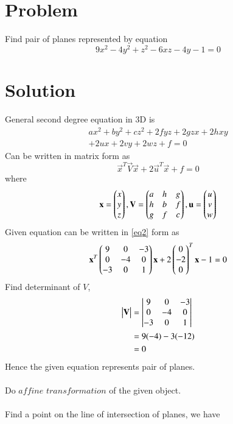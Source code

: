 \documentclass[journal,12pt,twocolumn]{IEEEtran}
\begin{document}
\section{Problem}
Find pair of planes represented by equation 
\begin{equation}\nonumber
	9x^2-4y^2+z^2-6xz-4y-1=0
\end{equation}
\section{Solution}
General second degree equation in 3D is
\begin{multline}\label{eq1}
	ax^2 + by^2 + cz^2 + 2fyz + 2gzx + 2hxy \\ + 2ux + 2vy + 2wz + f = 0
\end{multline}
Can be written in matrix form as
\begin{equation}\label{eq2}
	\vec{x}^T\vec{V}\vec{x} + 2\vec{u}^T\vec{x} + f = 0
\end{equation}
where
\begin{align}
	\mathbf{x}=\begin{pmatrix}x \\y\\z\end{pmatrix}, \mathbf{V}=\begin{pmatrix}a & h & g\\h & b & f\\g & f & c\end{pmatrix}, \mathbf{u}=\begin{pmatrix}u\\v\\w\end{pmatrix}
\end{align}
Given equation can be written in \eqref{eq2} form as
\begin{align}\label{eq4}
	\mathbf{x}^T \begin{pmatrix}9 & 0 & -3\\0 & -4 & 0\\-3 & 0 & 1\end{pmatrix}\mathbf{x} + 2 \begin{pmatrix}0\\-2\\0\end{pmatrix}^T \mathbf{x} -1 = 0
\end{align}
Find determinant of $V$,
\begin{align}
	\begin{vmatrix}\mathbf{V}\end{vmatrix} &= \begin{vmatrix}9 & 0 & -3\\0 & -4 & 0\\-3 & 0 & 1\end{vmatrix}\\
	 &= 9(-4) - 3(-12)\\
	 &= 0
\end{align}
Hence the given equation represents pair of planes.\\
\\
Do $affine$ $transformation$ of the given object.\\\\
Find a point on the line of intersection of planes, we have
\end{document}
